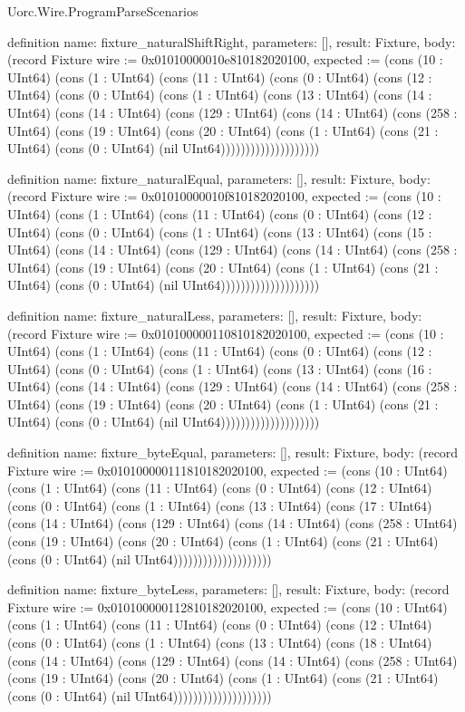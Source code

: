 \begin{lexlean}{Uorc.Wire.ProgramParseScenarios}
\begin{semanticmodule}
definition{
  name: fixture_naturalShiftRight,
  parameters: [],
  result: Fixture,
  body: (record Fixture {wire := 0x01010000010e810182020100, expected := (cons (10 : UInt64) (cons (1 : UInt64) (cons (11 : UInt64) (cons (0 : UInt64) (cons (12 : UInt64) (cons (0 : UInt64) (cons (1 : UInt64) (cons (13 : UInt64) (cons (14 : UInt64) (cons (14 : UInt64) (cons (129 : UInt64) (cons (14 : UInt64) (cons (258 : UInt64) (cons (19 : UInt64) (cons (20 : UInt64) (cons (1 : UInt64) (cons (21 : UInt64) (cons (0 : UInt64) (nil UInt64)))))))))))))))))))})
}

definition{
  name: fixture_naturalEqual,
  parameters: [],
  result: Fixture,
  body: (record Fixture {wire := 0x01010000010f810182020100, expected := (cons (10 : UInt64) (cons (1 : UInt64) (cons (11 : UInt64) (cons (0 : UInt64) (cons (12 : UInt64) (cons (0 : UInt64) (cons (1 : UInt64) (cons (13 : UInt64) (cons (15 : UInt64) (cons (14 : UInt64) (cons (129 : UInt64) (cons (14 : UInt64) (cons (258 : UInt64) (cons (19 : UInt64) (cons (20 : UInt64) (cons (1 : UInt64) (cons (21 : UInt64) (cons (0 : UInt64) (nil UInt64)))))))))))))))))))})
}

definition{
  name: fixture_naturalLess,
  parameters: [],
  result: Fixture,
  body: (record Fixture {wire := 0x010100000110810182020100, expected := (cons (10 : UInt64) (cons (1 : UInt64) (cons (11 : UInt64) (cons (0 : UInt64) (cons (12 : UInt64) (cons (0 : UInt64) (cons (1 : UInt64) (cons (13 : UInt64) (cons (16 : UInt64) (cons (14 : UInt64) (cons (129 : UInt64) (cons (14 : UInt64) (cons (258 : UInt64) (cons (19 : UInt64) (cons (20 : UInt64) (cons (1 : UInt64) (cons (21 : UInt64) (cons (0 : UInt64) (nil UInt64)))))))))))))))))))})
}

definition{
  name: fixture_byteEqual,
  parameters: [],
  result: Fixture,
  body: (record Fixture {wire := 0x010100000111810182020100, expected := (cons (10 : UInt64) (cons (1 : UInt64) (cons (11 : UInt64) (cons (0 : UInt64) (cons (12 : UInt64) (cons (0 : UInt64) (cons (1 : UInt64) (cons (13 : UInt64) (cons (17 : UInt64) (cons (14 : UInt64) (cons (129 : UInt64) (cons (14 : UInt64) (cons (258 : UInt64) (cons (19 : UInt64) (cons (20 : UInt64) (cons (1 : UInt64) (cons (21 : UInt64) (cons (0 : UInt64) (nil UInt64)))))))))))))))))))})
}

definition{
  name: fixture_byteLess,
  parameters: [],
  result: Fixture,
  body: (record Fixture {wire := 0x010100000112810182020100, expected := (cons (10 : UInt64) (cons (1 : UInt64) (cons (11 : UInt64) (cons (0 : UInt64) (cons (12 : UInt64) (cons (0 : UInt64) (cons (1 : UInt64) (cons (13 : UInt64) (cons (18 : UInt64) (cons (14 : UInt64) (cons (129 : UInt64) (cons (14 : UInt64) (cons (258 : UInt64) (cons (19 : UInt64) (cons (20 : UInt64) (cons (1 : UInt64) (cons (21 : UInt64) (cons (0 : UInt64) (nil UInt64)))))))))))))))))))})
}


\end{semanticmodule}
\end{lexlean}
